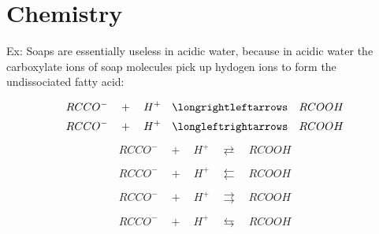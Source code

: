 \documentclass{article}
\begin{document}
\section{Chemistry}

Ex:
Soaps are essentially useless in acidic water, because in acidic water the carboxylate
ions of soap molecules pick up hydogen ions to form the undissociated fatty acid:


$$RCCO^- \quad + \quad H^+ \quad\longrightleftarrows\quad RCOOH$$
$$RCCO^- \quad + \quad H^+ \quad\longleftrightarrows\quad RCOOH$$

$$RCCO^- \quad + \quad H^+ \quad\rightleftarrows\quad RCOOH$$

$$RCCO^- \quad + \quad H^+ \quad\leftleftarrows\quad RCOOH$$

$$RCCO^- \quad + \quad H^+ \quad\rightrightarrows\quad RCOOH$$

$$RCCO^- \quad + \quad H^+ \quad\leftrightarrows\quad RCOOH$$
\end{document}
